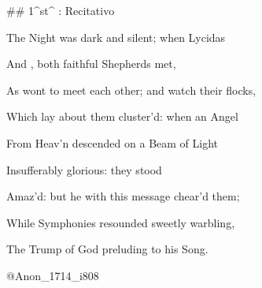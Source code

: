 \newpage
{}

## 1^st^ \mvmt: Recitativo

\beginnumbering
\pstart
The Night was dark and silent; when Lycidas 

And , both faithful Shepherds met, 

As wont to meet each other; and watch their flocks, 

Which lay about them cluster’d: when an Angel 

From Heav’n descended on a Beam of Light 

Insufferably glorious: they stood 

Amaz’d: but he with this message chear’d them; 

While Symphonies resounded sweetly warbling, 

The Trump of God preluding to his Song.
\pend
\endnumbering

@Anon_1714_i808

